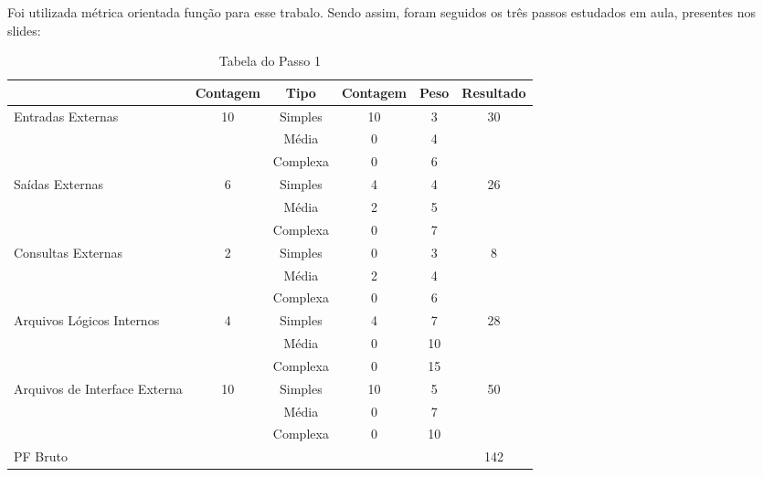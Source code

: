 \documentclass[
10pt, %
a4paper, %
oneside, %
headinclude,footinclude, %
BCOR5mm, %
]{scrartcl}
\begin{document}
Foi utilizada métrica orientada função para esse trabalo. Sendo assim,
foram seguidos os três passos estudados em aula, presentes nos slides:
\begin{table}[!h]
	\begin{adjustwidth}{-1.1cm}{}
	\begin{tabular}{l | c | c c c | c}
		\hline\hline
		\multicolumn{1}{r}{ } & \multicolumn{1}{c}{Contagem} & Tipo & Contagem & \multicolumn{1}{c}{Peso} & Resultado\\ 
		\hline\hline
		\multirow{3}{*}{Entradas Externas} & \multirow{3}{*}{10} & Simples & 10 & 3 & \multirow{3}{*}{30}\\ 
		\cline{3-5}
		&  & Média & 0 & 4 & \\ 
		\cline{3-5}
		&  & Complexa & 0 & 6 & \\ 
		\hline
		\multirow{3}{*}{Saídas Externas} & \multirow{3}{*}{6} & Simples & 4 & 4 & \multirow{3}{*}{26}\\ 
		\cline{3-5}
		&  & Média & 2 & 5 & \\ 
		\cline{3-5}
		&  & Complexa & 0 & 7 & \\ 
		\hline
		\multirow{3}{*}{Consultas Externas} & \multirow{3}{*}{2} & Simples & 0 & 3 & \multirow{3}{*}{8}\\ 
		\cline{3-5}
		&  & Média & 2 & 4 & \\ 
		\cline{3-5}
		&  & Complexa & 0 & 6 & \\ 
		\hline
		\multirow{3}{*}{Arquivos Lógicos Internos} & \multirow{3}{*}{4} & Simples & 4 & 7 & \multirow{3}{*}{28}\\ 
		\cline{3-5}
		&  & Média & 0 & 10 & \\ 
		\cline{3-5}
		&  & Complexa & 0 & 15 & \\ 
		\hline
		\multirow{3}{*}{Arquivos de Interface Externa} & \multirow{3}{*}{10} & Simples & 10 & 5 & \multirow{3}{*}{50}\\ 
		\cline{3-5}
		&  & Média & 0 & 7 & \\ 
		\cline{3-5}
		&  & Complexa & 0 & 10 & \\ 
		\hline
		\multicolumn{5}{l}{PF Bruto} & 142\\ 
		\hline
	\hline\end{tabular}
	\end{adjustwidth}
	\caption{\small{Tabela do Passo 1}} 
	\label{table:t3}
\end{table}
\end{document}
